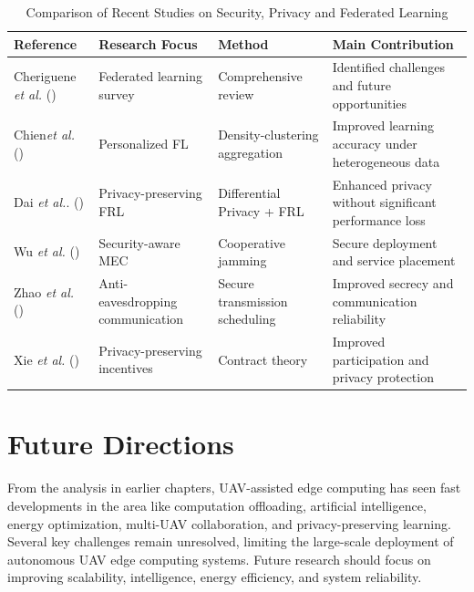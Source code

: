 \documentclass[a4paper, 12pt]{article}
\begin{document}
\begin{table}[ht]
\centering
\caption{Comparison of Recent Studies on Security, Privacy and Federated Learning}
\label{tab:security_comparison}
\begin{tabular}{|p{2.5cm}|p{3cm}|p{3cm}|p{3cm}|}
\hline
\textbf{Reference} &
\textbf{Research Focus} &
\textbf{Method} &
\textbf{Main Contribution}
\\
\hline

Cheriguene \textit{et al.} (\cite{Cheriguene2025})
&
Federated learning survey
&
Comprehensive review
&
Identified challenges and future opportunities
\\
\hline

Chien\textit{et al.} (\cite{Chien2025})
&
Personalized FL
&
Density-clustering aggregation
&
Improved learning accuracy under heterogeneous data
\\
\hline

Dai \textit{et al.}. (\cite{Dai2026})
&
Privacy-preserving FRL
&
Differential Privacy + FRL
&
Enhanced privacy without significant performance loss
\\
\hline

Wu \textit{et al.} (\cite{Wu2025Security})
&
Security-aware MEC
&
Cooperative jamming
&
Secure deployment and service placement
\\
\hline

Zhao \textit{et al.} (\cite{Zhao2025SecureTransmission})
&
Anti-eavesdropping communication
&
Secure transmission scheduling
&
Improved secrecy and communication reliability
\\
\hline

Xie \textit{et al.} (\cite{Xie2025Privacy})
&
Privacy-preserving incentives
&
Contract theory
&
Improved participation and privacy protection
\\
\hline

\end{tabular}
\end{table}

\section*{Future Directions}
From the analysis in earlier chapters, UAV-assisted edge computing has seen fast developments in the area like computation offloading, artificial intelligence, energy optimization, multi-UAV collaboration, and privacy-preserving learning. Several key challenges remain unresolved, limiting the large-scale deployment of autonomous UAV edge computing systems. Future research should focus on improving scalability, intelligence, energy efficiency, and system reliability.
\end{document}
